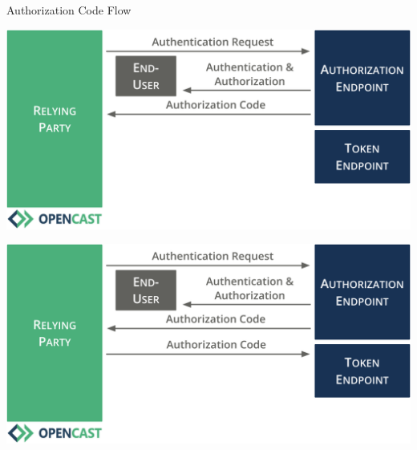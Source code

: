 \documentclass[aspectratio=169]{beamer}
\begin{document}
\begin{frame}{Authorization Code Flow}
	\vspace*{0.2em}
	\begin{overprint}
		\centerline{\includegraphics[height=0.84\textheight]{figures/authorization-code-flow-3}}
		\centerline{\includegraphics[height=0.84\textheight]{figures/authorization-code-flow-4}}
	\end{overprint}
	\vspace{-1.8em}
\end{frame}
\end{document}
